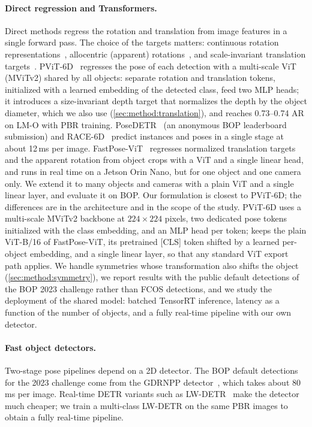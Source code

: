\paragraph{Direct regression and Transformers.}
Direct methods regress the rotation and translation from image features in a single forward
pass. The choice of the targets matters: continuous rotation representations~\cite{zhou2019continuity},
allocentric (apparent) rotations~\cite{kundu20183drcnn}, and scale-invariant translation
targets~\cite{li2019cdpn,wang2021gdrnet}. PViT-6D~\cite{stapf2023pvit6d} regresses the pose
of each detection with a multi-scale ViT (MViTv2) shared by all objects: separate rotation and
translation tokens, initialized with a learned embedding of the detected class, feed two MLP
heads; it introduces a size-invariant depth target that normalizes the depth by the object
diameter, which we also use (\cref{sec:method:translation}), and reaches 0.73--0.74 AR on LM-O
with PBR training. PoseDETR~\cite{bop_posedetr} (an anonymous BOP leaderboard submission) and
RACE-6D~\cite{ha2026race6d} predict instances and poses in a single stage at about 12\,ms per
image. FastPose-ViT~\cite{ancey2026fastposevit} regresses normalized
translation targets and the apparent rotation from object crops with a ViT and a single linear
head, and runs in real time on a Jetson Orin Nano, but for one object and one camera only. We
extend it to many objects and cameras with a plain ViT and a single linear layer, and evaluate it
on BOP. Our formulation is closest to PViT-6D; the differences are in the architecture and in
the scope of the study. PViT-6D uses a multi-scale MViTv2 backbone at $224 \times 224$ pixels,
two dedicated pose tokens initialized with the class embedding, and an MLP head per token;
\ours{} keeps the plain ViT-B/16 of FastPose-ViT, its pretrained [CLS] token shifted by a learned
per-object embedding, and a single linear layer, so that any standard ViT export path applies. We
handle symmetries whose transformation also shifts the object (\cref{sec:method:symmetry}), we
report results with the public default detections of the BOP 2023 challenge rather than FCOS
detections, and we study the deployment of the shared model: batched TensorRT inference, latency
as a function of the number of objects, and a fully real-time pipeline with our own detector.

\paragraph{Fast object detectors.}
Two-stage pose pipelines depend on a 2D detector. The BOP default detections for the 2023
challenge come from the GDRNPP detector~\cite{liu2022gdrnpp}, which takes about 80\,ms per image.
Real-time DETR variants such as LW-DETR~\cite{chen2024lwdetr} make the detector much cheaper; we
train a multi-class LW-DETR on the same PBR images to obtain a fully real-time pipeline.
